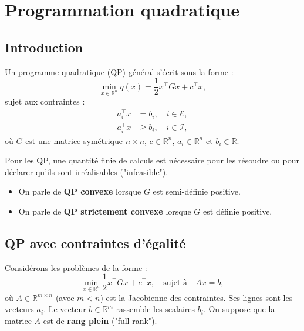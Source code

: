 \chapter{Programmation quadratique}
\label{chap:quadratic-programming}

\section{Introduction}

Un programme quadratique (QP) général s'écrit sous la forme :
\begin{equation}
    \min_{x \in \mathbb{R}^n} q(x) = \frac{1}{2} x^\top G x + c^\top x,
\end{equation}
sujet aux contraintes :
\begin{align}
    a_i^\top x &= b_i, \quad i \in \mathcal{E}, \\
    a_i^\top x &\geq b_i, \quad i \in \mathcal{I},
\end{align}
où $G$ est une matrice symétrique $n \times n$, $c \in \mathbb{R}^n$, $a_i \in \mathbb{R}^n$ et $b_i \in \mathbb{R}$.

\begin{remarque}
    Pour les QP, une quantité finie de calculs est nécessaire pour les résoudre ou pour déclarer qu'ils sont irréalisables ("infeasible").
    \begin{itemize}
        \item On parle de \textbf{QP convexe} lorsque $G$ est semi-définie positive.
        \item On parle de \textbf{QP strictement convexe} lorsque $G$ est définie positive.
    \end{itemize}
\end{remarque}

\section{QP avec contraintes d'égalité}

Considérons les problèmes de la forme :
\begin{equation}
    \min_{x \in \mathbb{R}^n} \frac{1}{2} x^\top G x + c^\top x, \quad \text{sujet à} \quad Ax = b,
\end{equation}
où $A \in \mathbb{R}^{m \times n}$ (avec $m < n$) est la Jacobienne des contraintes. Ses lignes sont les vecteurs $a_i$. Le vecteur $b \in \mathbb{R}^m$ rassemble les scalaires $b_i$.
On suppose que la matrice $A$ est de \textbf{rang plein} ("full rank").

